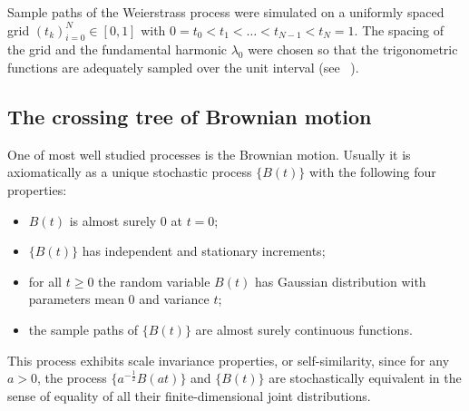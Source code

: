 \documentclass[a4paper]{article}
\begin{document}
Sample paths of the Weierstrass process were simulated on a uniformly spaced grid
$(t_k)_{i=0}^N\in [0,1]$ with $0 = t_0< t_1 < \ldots < t_{N-1} < t_N = 1$. The spacing
of the grid and the fundamental harmonic $\lambda_0$ were chosen so that the trigonometric
functions are adequately sampled over the unit interval (see ~\cite{decrouez2013}).


\subsection{The crossing tree of Brownian motion} %
\label{sub:the_crossing_tree_of_brownian_motion}

One of most well studied processes is the Brownian motion. Usually it is axiomatically
as a unique stochastic process $\bigl\{B(t)\bigr\}$ with the following four properties:
\begin{itemize}
    \item $B(t)$ is almost surely $0$ at $t=0$;
    \item $\{B(t)\}$ has independent and stationary increments;
    \item for all $t\geq 0$ the random variable $B(t)$ has Gaussian distribution with
    parameters mean $0$ and variance $t$;
    \item the sample paths of $\{B(t)\}$ are almost surely continuous functions.
\end{itemize}
This process exhibits scale invariance properties, or self-similarity, since for any
$a>0$, the process $\bigl\{a^{-\frac{1}{2}} B(at)\bigr\}$ and $\{B(t)\}$ are stochastically
equivalent in the sense of equality of all their finite-dimensional joint distributions.
\end{document}
